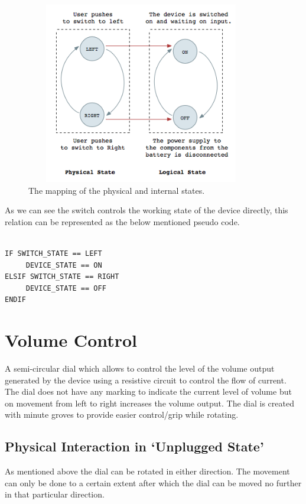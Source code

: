\documentclass[10pt,a4paper]{article}
\begin{document}
\begin{figure}[hbpt]
\centerline{\includegraphics[width=381px,height=300px,keepaspectratio]{PW2}}
\caption {The mapping of the physical and internal states.}
\label{physical_state_power_switch}
\end{figure}

\noindent
As we can see the switch controls the working state of the device directly, this relation can be represented as the below mentioned pseudo code.
\begin{center}
\begin{verbatim} 

IF SWITCH_STATE == LEFT
     DEVICE_STATE == ON
ELSIF SWITCH_STATE == RIGHT
     DEVICE_STATE == OFF
ENDIF

\end{verbatim} 
\end{center}
\section{Volume Control}
A semi-circular dial which allows to control the level of the volume output generated by the device using a resistive circuit to control the flow of current. The dial does not have any marking to indicate the current level of volume but on movement from left to right increases the volume output. The dial is created with minute groves to provide easier control/grip while rotating.


\subsection{Physical Interaction in `Unplugged State'}

As mentioned above the dial can be rotated in either direction. The movement can only be done to a certain extent after which the dial can be moved no further in that particular direction.
\end{document}
